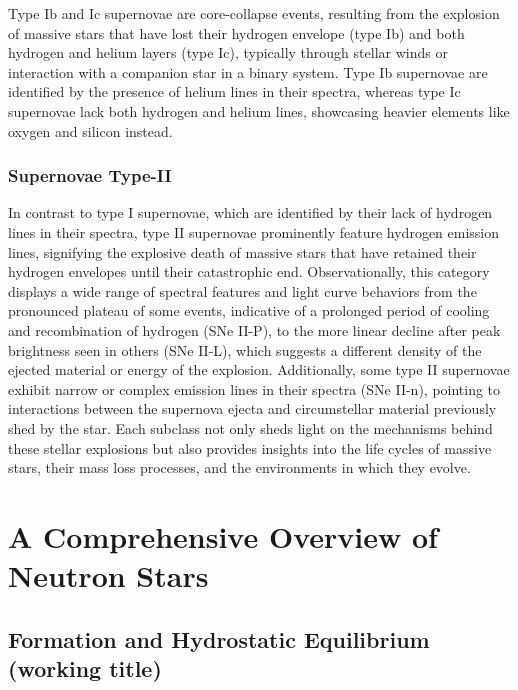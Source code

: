 \documentclass[main.tex]{subfiles}
\begin{document}
    Type Ib and Ic supernovae are core-collapse events, resulting from the explosion of massive stars that have lost their hydrogen envelope (type Ib) and both hydrogen and helium layers (type Ic), typically through stellar winds or interaction with a companion star in a binary system. Type Ib supernovae are identified by the presence of helium lines in their spectra, whereas type Ic supernovae lack both hydrogen and helium lines, showcasing heavier elements like oxygen and silicon instead.
    \subsubsection{Supernovae Type-II}
    In contrast to type I supernovae, which are identified by their lack of hydrogen lines in their spectra, type II supernovae prominently feature hydrogen emission lines, signifying the explosive death of massive stars that have retained their hydrogen envelopes until their catastrophic end. Observationally, this category displays a wide range of spectral features and light curve behaviors from the pronounced plateau of some events, indicative of a prolonged period of cooling and recombination of hydrogen (SNe II-P), to the more linear decline after peak brightness seen in others (SNe II-L), which suggests a different density of the ejected material or energy of the explosion. Additionally, some type II supernovae exhibit narrow or complex emission lines in their spectra (SNe II-n), pointing to interactions between the supernova ejecta and circumstellar material previously shed by the star.  Each subclass not only sheds light on the mechanisms behind these stellar explosions but also provides insights into the life cycles of massive stars, their mass loss processes, and the environments in which they evolve.














    \section{A Comprehensive Overview of Neutron Stars}\label{sec:ch1:ns_struct}

    \subsection{Formation and Hydrostatic Equilibrium (working title)}
\end{document}

